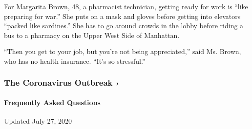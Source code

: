 For Margarita Brown, 48, a pharmacist technician, getting ready for work
is ``like preparing for war.'' She puts on a mask and gloves before
getting into elevators ``packed like sardines.'' She has to go around
crowds in the lobby before riding a bus to a pharmacy on the Upper West
Side of Manhattan.

``Then you get to your job, but you're not being appreciated,'' said Ms.
Brown, who has no health insurance. ``It's so stressful.''

\href{https://www.nytimes.com/news-event/coronavirus?action=click\&pgtype=Article\&state=default\&region=MAIN_CONTENT_3\&context=storylines_faq}{}

\hypertarget{the-coronavirus-outbreak-}{%
\subsubsection{The Coronavirus Outbreak
›}\label{the-coronavirus-outbreak-}}

\hypertarget{frequently-asked-questions}{%
\paragraph{Frequently Asked
Questions}\label{frequently-asked-questions}}

Updated July 27, 2020

